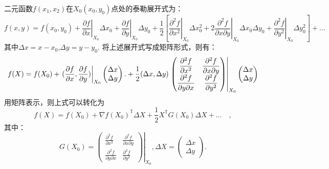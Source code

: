二元函数$f(x_1,x_2)$在$X_0(x_0,y_0)$点处的泰勒展开式为：
\begin{equation}
    f(x,y) = f(x_0,y_0)
        + \left.\displaystyle\frac{\partial f}{\partial x}\right|_{X_0}\Delta x_0    
        + \left.\displaystyle\frac{\partial f}{\partial y}\right|_{X_0}\Delta y_0    
        + \frac{1}{2}
        \left[ \left.\displaystyle\frac{\partial^2f}{\partial x^2}\right|_{X_0}\Delta x_0^2 + 
          2\left.\displaystyle\frac{\partial^2f}{\partial x\partial y}\right|_{X_0}\Delta x_0\Delta y_0 + 
          \left.\displaystyle\frac{\partial^2f}{\partial y^2}\right|_{X_0}\Delta y_0^2 \right]   
        + ...
\end{equation}
其中$\Delta x = x - x_0$,$\Delta y = y - y_0$.
将上述展开式写成矩阵形式，则有：
\begin{equation}
    f(X) = f(X_0) 
    + \left.( \displaystyle\frac{\partial f}{\partial x},
        \displaystyle\frac{\partial f}{\partial y} )\right|_{X_0}    
        \begin{pmatrix}
             \Delta x \\
             \Delta y
        \end{pmatrix}.
    +\newline \frac{1}{2}(\Delta x, \Delta y)
        \left.
        \begin{pmatrix}
            \displaystyle\frac{\partial^2f}{\partial x^2} & \displaystyle\frac{\partial^2f}{\partial x\partial y} \\
            \displaystyle\frac{\partial^2f}{\partial y\partial x} & \displaystyle\frac{\partial^2f}{\partial y^2}
        \end{pmatrix}
        \right|_{X_0}
        \begin{pmatrix}
             \Delta x \\
             \Delta y
        \end{pmatrix}
\end{equation}
用矩阵表示，则上式可以转化为
\begin{equation}
    f(X) = f(X_0) + \nabla f(X_0)^{\mathbb{T}}\Delta X + \frac{1}{2}X^{\mathbb{T}}G(X_0)\Delta X + ...\quad,
\end{equation}
其中：
\begin{equation}
    G(X_0) = 
        \left.
        \begin{pmatrix}
            \displaystyle\frac{\partial^2f}{\partial x^2} & \displaystyle\frac{\partial^2f}{\partial x\partial y} \\
            \displaystyle\frac{\partial^2f}{\partial y\partial x} & \displaystyle\frac{\partial^2f}{\partial y^2}
        \end{pmatrix}
        \right|_{X_0},
    \Delta X = 
        \begin{pmatrix}
             \Delta x \\
             \Delta y
        \end{pmatrix}.
\end{equation}


